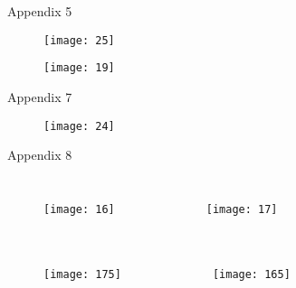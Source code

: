 \documentclass{beamer}
\begin{document}
\begin{frame}{Appendix 5}
		\hypertarget{5}{}
\begin{figure}
	\centering
	\texttt{[image: 25]}
	\label{fig:25}
\end{figure}	

\end{frame}

\begin{frame}	\hypertarget{6}{}
	\begin{figure}
		\centering
		\texttt{[image: 19]}
		\caption{}
	\end{figure}
 \end{frame}
\begin{frame}{Appendix 7}	\hypertarget{7}{}
	\begin{figure}
		\centering
		\texttt{[image: 24]}
		\caption{}
	\end{figure}
\end{frame}
 \begin{frame}{Appendix 8}
 		\hypertarget{8}{}
 	
 	\begin{columns}

	\begin{figure}
		\centering
		\texttt{[image: 16]}
		\caption{}
	\end{figure}
	\begin{figure}
		\centering
		\texttt{[image: 17]}
		\caption{}
		\label{fig:17}
	\end{figure}
	\end{columns}
\end{frame}
	
\begin{frame}\hypertarget{9}{}
\begin{columns}
	\column{.45\textwidth}
	\begin{figure}
		\centering
		\texttt{[image: 175]}
	\end{figure}
	\column{.49\textwidth}
	\begin{figure}
		\centering
		\texttt{[image: 165]}
	\end{figure}
\end{columns}
\end{frame}
\end{document}
